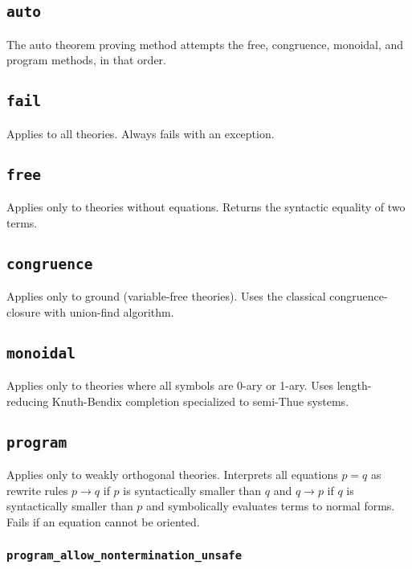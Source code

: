 \documentclass[10pt]{book}
\begin{document}
\subsection{{\tt auto}}

The auto theorem proving method attempts the free, congruence, monoidal, and program methods, in that order.

 \subsection{{\tt fail}}
 
 Applies to all theories.  Always fails with an exception.
 
  \subsection{{\tt free}}
  
  Applies only to theories without equations.  Returns the syntactic equality of two terms.

\subsection{{\tt congruence}}

 Applies only to ground (variable-free theories).  Uses the classical congruence-closure with union-find algorithm.

\subsection{{\tt monoidal}}

Applies only to theories where all symbols are 0-ary or 1-ary.  Uses length-reducing Knuth-Bendix completion specialized to semi-Thue systems.

\subsection{{\tt program}}

Applies only to weakly orthogonal theories.  Interprets all equations $p = q$ as rewrite rules $p \to q$ if $p$ is syntactically smaller than $q$ and $q \to p$ if $q$ is syntactically smaller than $p$ and symbolically evaluates terms to normal forms.  Fails if an equation cannot be oriented.

\subsubsection{{\tt program\_allow\_nontermination\_unsafe}}
\end{document}
